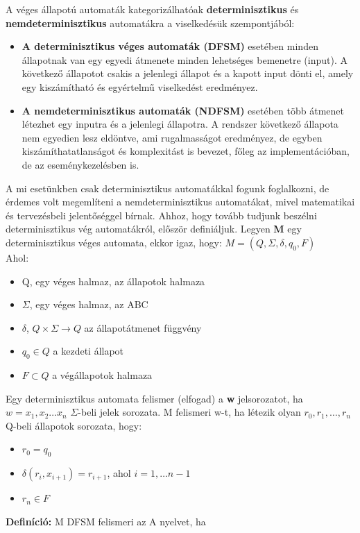 A véges állapotú automaták kategorizálhatóak \textbf{determinisztikus} és \textbf{nemdeterminisztikus} automatákra a viselkedésük szempontjából:
\begin{itemize}
	\item \textbf{A determinisztikus véges automaták (DFSM)} esetében minden állapotnak van egy egyedi átmenete minden lehetséges bemenetre (input). A következő állapotot csakis a jelenlegi állapot és a kapott input dönti el, amely egy kiszámítható és egyértelmű viselkedést eredményez.
	\item \textbf{A nemdeterminisztikus automaták (NDFSM)} esetében több át\-menet létezhet egy inputra és a jelenlegi állapotra. A rendszer következő állapota nem egyedien lesz eldöntve, ami rugalmasságot eredményez, de egyben kiszámíthatatlanságot és komplexitást is bevezet, főleg az implementációban, de az eseménykezelésben is.
\end{itemize}
A mi esetünkben csak determinisztikus automatákkal fogunk foglalkozni, de érdemes volt megemlíteni a nemdeterminisztikus automatákat, mivel matematikai és tervezésbeli jelentőséggel bírnak.
Ahhoz, hogy tovább tudjunk beszélni determinisztikus vég automatákról, először definiáljuk. Legyen \textbf{M} egy determinisztikus véges automata, ekkor igaz, hogy:
$M = (Q, \Sigma, \delta, q_{0},F)$ \cite{Kyong2015}\\
Ahol:
\begin{itemize}
	\item[1] Q, egy véges halmaz, az állapotok halmaza
	\item[2] $\Sigma$, egy véges halmaz, az ABC
	\item[3] $\delta$, $Q \times \Sigma \to Q$ az állapotátmenet függvény
	\item[4] $q_{0} \in Q$ a kezdeti állapot
	\item[5] $F \subset Q$ a végállapotok halmaza
\end{itemize}
Egy determinisztikus automata felismer (elfogad) a \textbf{w} jelsorozatot, ha $w = x_{1},x_{2}\dots x_{n}$ $\Sigma$-beli jelek sorozata. M felismeri w-t, ha létezik olyan $r_{0},r_{1},\dots,r_{n}$ Q-beli állapotok sorozata, hogy:
\begin{itemize}
	\item $r_{0} = q_{0}$
	\item $\delta(r_{i},x_{i+1}) = r_{i+1}$, ahol $i=1,\dots n-1$
	\item $r_{n} \in F$
\end{itemize}
\textbf{Definíció:} M DFSM felismeri az A nyelvet, ha

